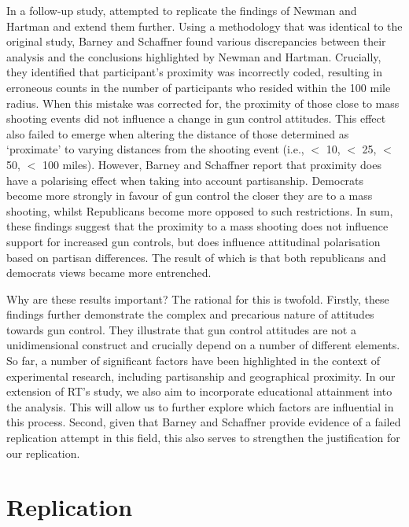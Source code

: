 \documentclass[11pt]{article}
\begin{document}
In a follow-up study, \textcite{barney2019reexamining-the} attempted to replicate the findings of Newman and Hartman and extend them further. Using a methodology that was identical to the original study, Barney and Schaffner found various discrepancies between their analysis and the conclusions highlighted by Newman and Hartman. Crucially, they identified that participant’s proximity was incorrectly coded, resulting in erroneous counts in the number of participants who  resided within the 100 mile radius. When this mistake was corrected for, the proximity of those close to mass shooting events did not influence a change in gun control attitudes. This effect also failed to emerge when altering the distance of those determined as ‘proximate’ to varying distances from the shooting event (i.e., \(<\) 10, \(<\) 25, \(<\) 50, \(<\) 100 miles). However, Barney and Schaffner report that proximity does have a polarising effect when taking into account partisanship. Democrats become more strongly in favour of gun control the closer they are to a mass shooting, whilst Republicans become more opposed to such restrictions. In sum, these findings suggest that the proximity to a mass shooting does not influence support for increased gun controls, but does influence attitudinal polarisation based on partisan differences. The result of which is that both republicans and democrats views became more entrenched. 

Why are these results important? The rational for this is twofold. Firstly, these findings further demonstrate the complex and precarious nature of attitudes towards gun control. They illustrate that gun control attitudes are not a unidimensional construct and crucially depend on a number of different elements. So far, a number of significant factors have been highlighted in the context of experimental research, including partisanship and geographical proximity. In our extension of RT's study, we also aim to incorporate educational attainment into the analysis. This will allow us to further explore which factors are influential in this process. Second, given that Barney and Schaffner provide evidence of a failed replication attempt in this field, this also serves to strengthen the justification for our replication. 

\section*{Replication}
\end{document}

